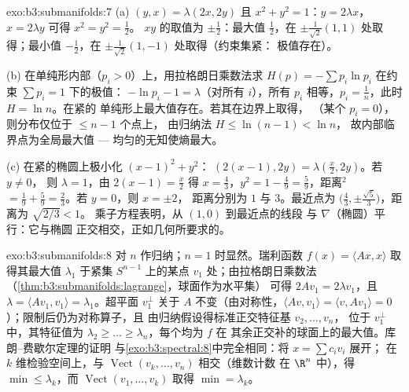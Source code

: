 \begin{solution}{exo:b3:submanifolds:7}
(a) $(y, x) = \lambda(2x, 2y)$ 且 $x^2 + y^2 = 1$：$y =
2\lambda x$，$x = 2\lambda y$ 可得 $x^2 = y^2 = \frac12$。
$xy$ 的取值为 $\pm\frac12$：最大值 $\frac12$，在
$\pm\frac1{\sqrt2}(1,1)$ 处取得；最小值 $-\frac12$，在
$\pm\frac1{\sqrt2}(1,-1)$ 处取得（约束集紧：
极值存在）。

(b) 在单纯形内部（$p_i > 0$）上，用拉格朗日乘数法求
$H(p) = -\sum p_i\ln p_i$ 在约束 $\sum p_i = 1$ 下的极值：
$-\ln p_i - 1 = \lambda$（对所有 $i$），所有 $p_i$ 相等，$p_i =
\frac1n$，此时 $H = \ln n$。在紧的
单纯形上最大值存在。若其在边界上取得，
（某个 $p_i = 0$），则分布仅位于 $\leq n - 1$ 个点上，
由归纳法 $H \leq \ln(n-1) < \ln n$，
故内部临界点为全局最大值 ---
均匀的无知使熵最大。

(c) 在紧的椭圆上极小化 $(x-1)^2 + y^2$：
$(2(x{-}1), 2y) = \lambda(\frac x2, 2y)$。若 $y \neq 0$，
则 $\lambda = 1$，由 $2(x - 1) = \frac x2$ 得 $x =
\frac43$，$y^2 = 1 - \frac49 = \frac59$，距离$^2$ $=
\frac19 + \frac59 = \frac23$。若 $y = 0$，则 $x = \pm2$，
距离分别为 $1$ 与 $3$。最近点为 $\bigl(\frac43,
\pm\frac{\sqrt5}3\bigr)$，距离为 $\sqrt{2/3} < 1$。
乘子方程表明，从 $(1,0)$ 到最近点的线段
与 $\nabla$（椭圆）平行：它与椭圆
正交相交，正如几何所要求的。
\end{solution}

\begin{solution}{exo:b3:submanifolds:8}
对 $n$ 作归纳；$n = 1$ 时显然。瑞利函数
$f(x) = \langle Ax, x\rangle$ 取得其最大值 $\lambda_1$
于紧集 $S^{n-1}$ 上的某点 $v_1$ 处；由拉格朗日乘数法
（\cref{thm:b3:submanifolds:lagrange}，球面作为水平集）
可得 $2Av_1 = 2\lambda v_1$，且 $\lambda = \langle Av_1,
v_1\rangle = \lambda_1$。超平面 $v_1^\perp$ 关于
$A$ 不变（由对称性，$\langle Av, v_1\rangle = \langle
v, Av_1\rangle = 0$）；限制后仍为对称算子，且
由归纳假设得标准正交特征基 $v_2, \dots, v_n$，
位于 $v_1^\perp$ 中，其特征值为 $\lambda_2 \geq \dots \geq
\lambda_n$，每个均为 $f$ 在
其余正交补的球面上的最大值。库朗–费歇尔定理的证明
与\cref{exo:b3:spectral:8}中完全相同：将 $x = \sum c_iv_i$ 展开；
在 $k$ 维检验空间上，与
$\operatorname{Vect}(v_k, \dots, v_n)$ 相交（维数计数
在 $\R^n$ 中），得 $\min \leq \lambda_k$，而
$\operatorname{Vect}(v_1, \dots, v_k)$ 取得 $\min =
\lambda_k$。
\end{solution}

